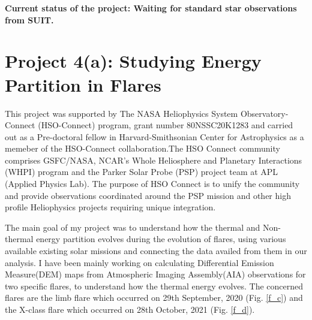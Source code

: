 \documentclass[a4paper,11pt]{article}
\begin{document}
\textbf{Current status of the project: Waiting for standard star observations from SUIT.}

\section*{Project 4(a): Studying Energy Partition in Flares}

This project was supported by The NASA Heliophysics System Observatory-Connect (HSO-Connect) program, grant number 80NSSC20K1283 and carried out as a Pre-doctoral fellow in Harvard-Smithsonian Center for Astrophysics as a memeber of the HSO-Connect collaboration.The HSO Connect community comprises GSFC/NASA, NCAR's Whole Heliosphere and Planetary Interactions (WHPI) program and the Parker Solar Probe (PSP) project team at APL (Applied Physics Lab). The purpose of HSO Connect is to unify the community and provide observations coordinated around the PSP mission and other high profile Heliophysics projects requiring unique integration.  

The main goal of my project was to understand how the thermal and Non-thermal energy partition evolves during the evolution of flares, using various available existing solar missions and connecting the data availed from them in our analysis. I have been mainly working on calculating Differential Emission Measure(DEM) maps from Atmospheric Imaging Assembly(AIA) observations for two specific flares, to understand how the thermal energy evolves. The concerned flares are the limb flare which occurred on 29th September, 2020 (Fig. \ref{f_c}) and the X-class flare which occurred on 28th October, 2021 (Fig. \ref{f_d}).
\end{document}

